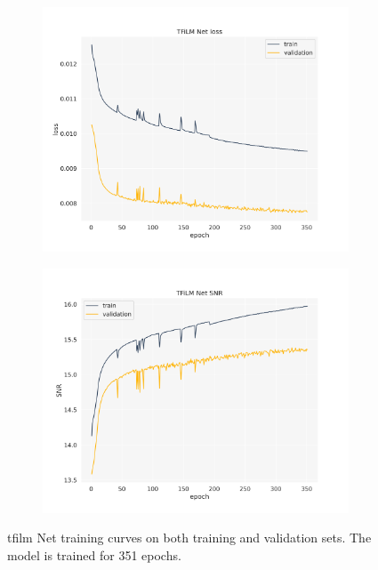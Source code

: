 \begin{figure}[!htb]
	\begin{subfigure}{.5\textwidth}
		\centering
		\includegraphics[width=1.05\linewidth]{img/tfilmnet_loss.png}
		\label{fig:tfilmnet_loss}
	\end{subfigure}%
	\begin{subfigure}{.5\textwidth}
		\centering
		\includegraphics[width=1.05\linewidth]{img/tfilmnet_snr.png}
		\label{fig:tfilmnet_snr}
	\end{subfigure}%
	\caption{\gls{tfilm} Net training curves on both training and validation sets. The model is trained for 351 epochs.}
	\label{fig:tfilmnet_training_curves}
\end{figure}

